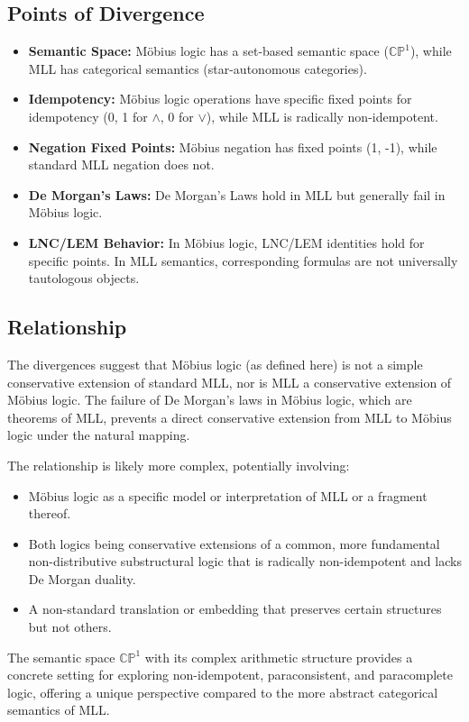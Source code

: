 \documentclass{article}
\begin{document}
	\subsection{Points of Divergence}
	\begin{itemize}
		\item \textbf{Semantic Space:} M\"{o}bius logic has a set-based semantic space ($\mathbb{CP}^1$), while MLL has categorical semantics (star-autonomous categories).
		\item \textbf{Idempotency:} M\"{o}bius logic operations have specific fixed points for idempotency ({0, 1} for $\wedge$, {0} for $\vee$), while MLL is radically non-idempotent.
		\item \textbf{Negation Fixed Points:} M\"{o}bius negation has fixed points ({1, -1}), while standard MLL negation does not.
		\item \textbf{De Morgan's Laws:} De Morgan's Laws hold in MLL but generally fail in M\"{o}bius logic.
		\item \textbf{LNC/LEM Behavior:} In M\"{o}bius logic, LNC/LEM identities hold for specific points. In MLL semantics, corresponding formulas are not universally tautologous objects.
	\end{itemize}

	\subsection{Relationship}
	The divergences suggest that M\"{o}bius logic (as defined here) is not a simple conservative extension of standard MLL, nor is MLL a conservative extension of M\"{o}bius logic. The failure of De Morgan's laws in M\"{o}bius logic, which are theorems of MLL, prevents a direct conservative extension from MLL to M\"{o}bius logic under the natural mapping.

	The relationship is likely more complex, potentially involving:
	\begin{itemize}
		\item M\"{o}bius logic as a specific model or interpretation of MLL or a fragment thereof.
		\item Both logics being conservative extensions of a common, more fundamental non-distributive substructural logic that is radically non-idempotent and lacks De Morgan duality.
		\item A non-standard translation or embedding that preserves certain structures but not others.
	\end{itemize}
	The semantic space $\mathbb{CP}^1$ with its complex arithmetic structure provides a concrete setting for exploring non-idempotent, paraconsistent, and paracomplete logic, offering a unique perspective compared to the more abstract categorical semantics of MLL.
\end{document}
